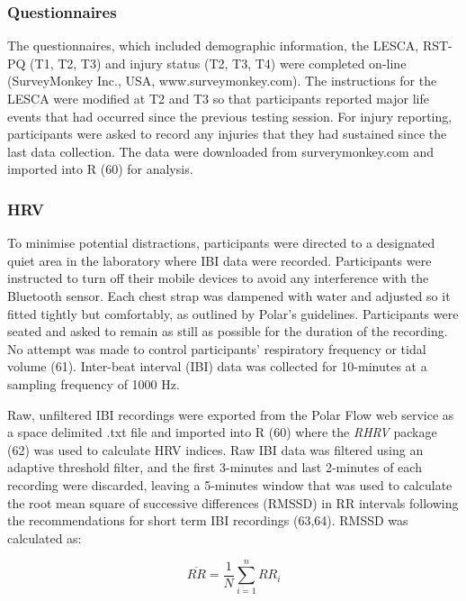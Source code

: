 \documentclass[
  english,
  man]{apa6}
\begin{document}
\hypertarget{questionnaires}{%
\subsubsection{Questionnaires}\label{questionnaires}}

The questionnaires, which included demographic information, the LESCA, RST-PQ (T1, T2, T3) and injury status (T2, T3, T4) were completed on-line (SurveyMonkey Inc., USA, www.surveymonkey.com).
The instructions for the LESCA were modified at T2 and T3 so that participants reported major life events that had occurred since the previous testing session.
For injury reporting, participants were asked to record any injuries that they had sustained since the last data collection.
The data were downloaded from surverymonkey.com and imported into R (60) for analysis.

\hypertarget{hrv}{%
\subsubsection{HRV}\label{hrv}}

To minimise potential distractions, participants were directed to a designated quiet area in the laboratory where IBI data were recorded.
Participants were instructed to turn off their mobile devices to avoid any interference with the Bluetooth sensor.
Each chest strap was dampened with water and adjusted so it fitted tightly but comfortably, as outlined by Polar's guidelines.
Participants were seated and asked to remain as still as possible for the duration of the recording.
No attempt was made to control participants' respiratory frequency or tidal volume (61).
Inter-beat interval (IBI) data was collected for 10-minutes at a sampling frequency of 1000 Hz.

Raw, unfiltered IBI recordings were exported from the Polar Flow web service as a space delimited .txt file and imported into R (60) where the \emph{RHRV} package (62) was used to calculate HRV indices.
Raw IBI data was filtered using an adaptive threshold filter, and the first 3-minutes and last 2-minutes of each recording were discarded, leaving a 5-minutes window that was used to calculate the root mean square of successive differences (RMSSD) in RR intervals following the recommendations for short term IBI recordings (63,64). RMSSD was calculated as:

\begin{equation} 
  \overline{RR} = \frac{1}{N} \sum_{i=1}^{n} RR_i
\end{equation}
\end{document}
